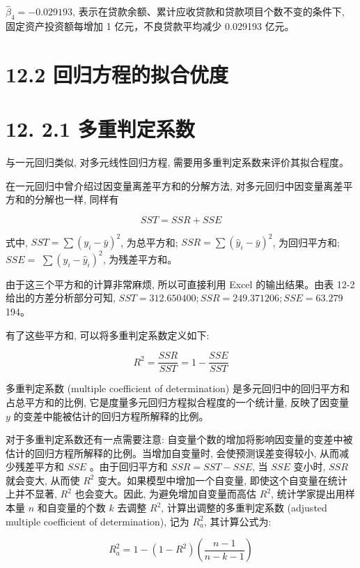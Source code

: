 \documentclass[10pt]{article}
\begin{document}
\begin{CJK*}{UTF8}{bsmi}
$\hat{\beta}_{4}=-0.029193$, 表示在贷款余额、累计应收贷款和贷款项目个数不变的条件下, 固定资产投资额每增加 1 亿元，不良贷款平均减少 0.029193 亿元。

\section*{12.2 回归方程的拟合优度}
\section*{12. 2.1 多重判定系数}
与一元回归类似, 对多元线性回归方程, 需要用多重判定系数来评价其拟合程度。

在一元回归中曾介绍过因变量离差平方和的分解方法, 对多元回归中因变量离差平方和的分解也一样, 同样有


\begin{equation*}
S S T=S S R+S S E \tag{12.6}
\end{equation*}


式中, $S S T=\sum\left(y_{i}-\bar{y}\right)^{2}$, 为总平方和; $S S R=\sum\left(\hat{y}_{i}-\bar{y}\right)^{2}$, 为回归平方和; $S S E=$ $\sum\left(y_{i}-\hat{y}_{i}\right)^{2}$, 为残差平方和。

由于这三个平方和的计算非常麻烦, 所以可直接利用 Excel 的输出结果。由表 12-2 给出的方差分析部分可知, $S S T=312.650400 ; S S R=249.371206 ; S S E=63.279$ 194。

有了这些平方和, 可以将多重判定系数定义如下:


\begin{equation*}
R^{2}=\frac{S S R}{S S T}=1-\frac{S S E}{S S T} \tag{12.7}
\end{equation*}


多重判定系数 (multiple coefficient of determination) 是多元回归中的回归平方和占总平方和的比例, 它是度量多元回归方程拟合程度的一个统计量, 反映了因变量 $y$ 的变差中能被估计的回归方程所解释的比例。

对于多重判定系数还有一点需要注意: 自变量个数的增加将影响因变量的变差中被估计的回归方程所解释的比例。当增加自变量时, 会使预测误差变得较小, 从而减少残差平方和 $S S E$ 。由于回归平方和 $S S R=S S T-S S E$, 当 $S S E$ 变小时, $S S R$ 就会变大, 从而使 $R^{2}$ 变大。如果模型中增加一个自变量, 即使这个自变量在统计上并不显著, $R^{2}$ 也会变大。因此, 为避免增加自变量而高估 $R^{2}$, 统计学家提出用样本量 $n$ 和自变量的个数 $k$ 去调整 $R^{2}$, 计算出调整的多重判定系数 (adjusted multiple coefficient of determination), 记为 $R_{a}^{2}$, 其计算公式为:


\begin{equation*}
R_{a}^{2}=1-\left(1-R^{2}\right)\left(\frac{n-1}{n-k-1}\right) \tag{12.8}
\end{equation*}



\end{CJK*}
\end{document}
